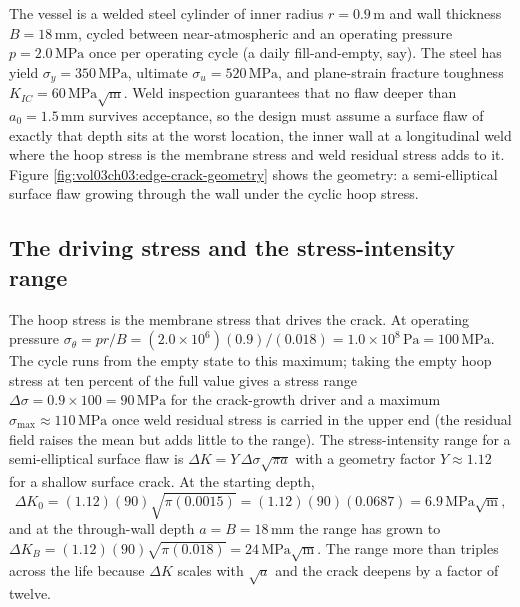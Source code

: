 The vessel is a welded steel cylinder of inner radius $r = 0.9\,\si{
\meter}$ and wall thickness $B = 18\,\si{\milli\meter}$, cycled between
near-atmospheric and an operating pressure $p = 2.0\,\text{MPa}$ once per
operating cycle (a daily fill-and-empty, say). The steel has yield
$\sigma_y = 350\,\text{MPa}$, ultimate $\sigma_u = 520\,\text{MPa}$, and
plane-strain fracture toughness $K_{IC} = 60\,\text{MPa}\sqrt{\text{m}}$.
Weld inspection guarantees that no flaw deeper than $a_0 = 1.5\,\si{
\milli\meter}$ survives acceptance, so the design must assume a surface
flaw of exactly that depth sits at the worst location, the inner wall at
a longitudinal weld where the hoop stress is the membrane stress and
weld residual stress adds to it. Figure
\ref{fig:vol03ch03:edge-crack-geometry} shows the geometry: a
semi-elliptical surface flaw growing through the wall under the cyclic
hoop stress.





\subsection{The driving stress and the stress-intensity range}

The hoop stress is the membrane stress that drives the crack. At
operating pressure $\sigma_{\theta} = pr/B = (2.0\times 10^6)(0.9)/
(0.018) = 1.0\times 10^8\,\text{Pa} = 100\,\text{MPa}$. The cycle runs
from the empty state to this maximum; taking the empty hoop stress at
ten percent of the full value gives a stress range $\Delta\sigma =
0.9\times 100 = 90\,\text{MPa}$ for the crack-growth driver and a maximum
$\sigma_{\max} \approx 110\,\text{MPa}$ once weld residual stress is
carried in the upper end (the residual field raises the mean but adds
little to the range). The stress-intensity range for a semi-elliptical
surface flaw is $\Delta K = Y\,\Delta\sigma\sqrt{\pi a}$ with a geometry
factor $Y \approx 1.12$ for a shallow surface crack. At the starting
depth,
\[
\Delta K_0 = (1.12)(90)\sqrt{\pi(0.0015)} = (1.12)(90)(0.0687) =
6.9\,\text{MPa}\sqrt{\text{m}},
\]
and at the through-wall depth $a = B = 18\,\si{\milli\meter}$ the range
has grown to $\Delta K_B = (1.12)(90)\sqrt{\pi(0.018)} = 24\,\text{MPa}
\sqrt{\text{m}}$. The range more than triples across the life because
$\Delta K$ scales with $\sqrt{a}$ and the crack deepens by a factor of
twelve.

